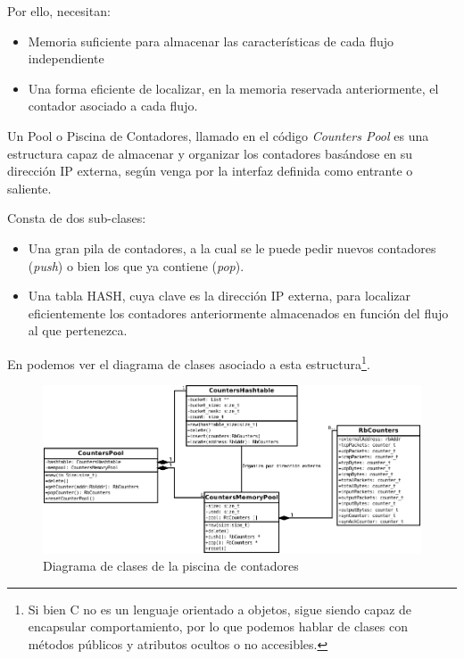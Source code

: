 Por ello, necesitan:
\begin{itemize}
 \item Memoria suficiente para almacenar las características de cada flujo independiente
 \item Una forma eficiente de localizar, en la memoria reservada anteriormente, el contador asociado a cada flujo.
\end{itemize}

Un Pool o Piscina de Contadores, llamado en el código \emph{Counters Pool} es una 
estructura capaz de almacenar y organizar los contadores basándose en su dirección IP externa, según venga por la 
interfaz definida como entrante o saliente.

Consta de dos sub-clases:
\begin{itemize}
 \item Una gran pila de contadores, a la cual se le puede pedir nuevos contadores (\emph{push}) o bien los que ya 
contiene (\emph{pop}).
 \item Una tabla HASH, cuya clave es la dirección IP externa, para localizar eficientemente los contadores 
anteriormente almacenados en función del flujo al que pertenezca.
\end{itemize}

En  podemos ver el diagrama de clases asociado a esta estructura\footnote{Si bien C no es un 
lenguaje orientado a objetos, sigue siendo capaz de encapsular comportamiento, por lo que podemos hablar de clases 
con métodos públicos y atributos ocultos o no accesibles.}.


\begin{figure}[htbp]
\centering
\includegraphics[width=\textwidth]{CapituloEstructura/Figuras/DiagramaClasesContadores-crop}
\caption{Diagrama de clases de la piscina de contadores}
\end{figure}
%


